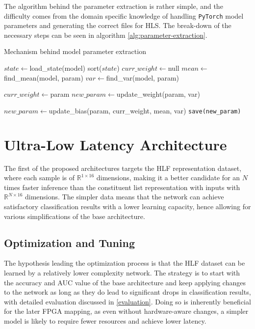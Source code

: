 The algorithm behind the parameter extraction is rather simple, and the difficulty comes from the domain specific knowledge of handling \texttt{PyTorch} model parameters and generating the correct files for HLS. The break-down of the necessary steps can be seen in algorithm \ref{alg:parameter-extraction}.

\begin{algorithm}
  \caption{Mechanism behind model parameter extraction}\label{alg:parameter-extraction}
  \begin{algorithmic}[1]
    \State $state \gets $load\_state(model)
    \State sort($state$)
    \State $curr\_weight \gets $null
      \State $mean \gets $find\_mean(model, param)
      \State $var \gets $find\_var(model, param)

        \State $curr\_weight \gets $param
        \State $new\_param \gets $update\_weight(param, var)

      \Else
        
        \State $new\_param \gets $update\_bias(param, curr\_weight, mean, var)
      \EndIf
      \State \texttt{save(new\_param)}
    \EndFor
  \end{algorithmic}
\end{algorithm}



\section{Ultra-Low Latency Architecture}
The first of the proposed architectures targets the HLF representation dataset, where each sample is of \(\mathbb{R}^{1 \times 16}\) dimensions, making it a better candidate for an \(N\) times faster inference than the constituent list representation with inputs with \(\mathbb{R}^{N \times 16}\) dimensions. The simpler data means that the network can achieve satisfactory classification results with a lower learning capacity, hence allowing for various simplifications of the base architecture.

\subsection{Optimization and Tuning}
The hypothesis leading the optimization process is that the HLF dataset can be learned by a relatively lower complexity network. The strategy is to start with the accuracy and AUC value of the base architecture and keep applying changes to the network as long as they do lead to significant drops in classification results, with detailed evaluation discussed in 
\cref{evaluation}. Doing so is inherently beneficial for the later FPGA mapping, as even without hardware-aware changes, a simpler model is likely to require fewer resources and achieve lower latency.

